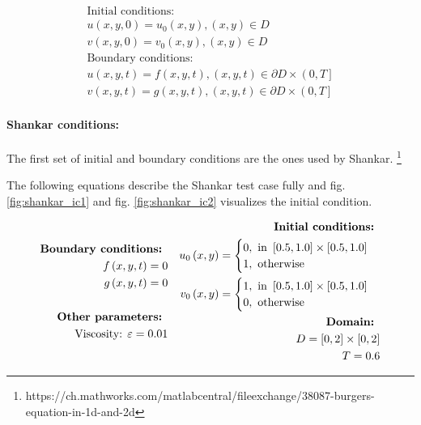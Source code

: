 \begin{equation}
\begin{split}
\text{Initial conditions: } \\
u\left(x, y, 0\right) = u_0\left(x, y\right), \left(x, y\right) \in D \\
v\left(x, y, 0\right) = v_0\left(x, y\right), \left(x, y\right) \in D \\
\text{Boundary conditions: } \\
u\left(x, y, t\right) = f\left(x, y, t\right), \left(x, y, t\right) \in \partial D \times \left(0, T\right] \\
v\left(x, y, t\right) = g\left(x, y, t\right), \left(x, y, t\right) \in \partial D \times \left(0, T\right]
\end{split}
\end{equation}


\paragraph{Shankar conditions:}

The first set of initial and boundary conditions are the ones used by Shankar. \footnote{https://ch.mathworks.com/matlabcentral/fileexchange/38087-burgers-equation-in-1d-and-2d}

The following equations describe the Shankar test case fully and fig. \ref{fig:shankar_ic1} and fig. \ref{fig:shankar_ic2} visualizes the initial condition.

\begin{equation}
\begin{split}
\text{\textbf{Boundary conditions: }} \\
f\left(x, y, t\right) = 0 \\
g\left(x, y, t\right) = 0 \\
\\
\text{\textbf{Other parameters: }} \\
\text{Viscosity: } \varepsilon = 0.01
\end{split}
\quad
\begin{split}
\text{\textbf{Initial conditions: }} \\
u_0\left(x, y\right) = \begin{cases}
0, \text{ in } \left[0.5, 1.0\right] \times \left[0.5, 1.0\right] \\
1, \text{ otherwise}
\end{cases}
\\
v_0\left(x, y\right) =  \begin{cases}
1, \text{ in } \left[0.5, 1.0\right] \times \left[0.5, 1.0\right] \\
0, \text{ otherwise}
\end{cases}
\\
\text{\textbf{Domain: }} \\
D = \left[0,2\right] \times \left[0,2\right] \\
T = 0.6 \\
\end{split}
\end{equation}

